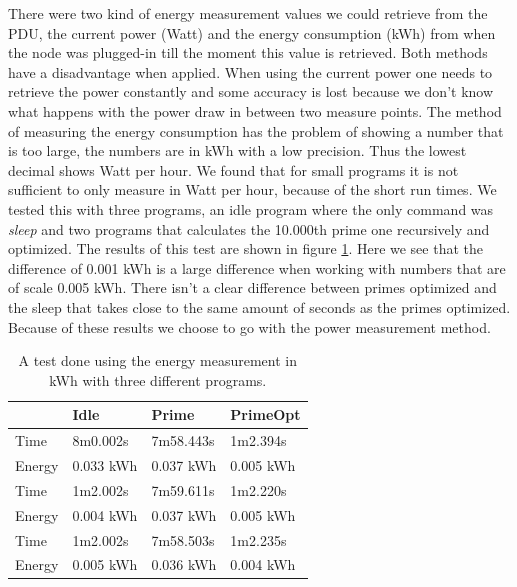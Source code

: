There were two kind of energy measurement values we could retrieve from the PDU, the current power (Watt) and the energy consumption (kWh) from when the node was plugged-in till the moment this value is retrieved. Both methods have a disadvantage when applied. When using the current power one needs to retrieve the power constantly and some accuracy is lost because we don't know what happens with the power draw in between two measure points. The method of measuring the energy consumption has the problem of showing a number that is too large, the numbers are in kWh with a low precision. Thus the lowest decimal shows Watt per hour. We found that for small programs it is not sufficient to only measure in Watt per hour, because of the short run times. We tested this with three programs, an idle program where the only command was \textit{sleep} and two programs that calculates the 10.000th prime one recursively and optimized. The results of this test are shown in figure \ref{tab:EMmethod}. Here we see that the difference of 0.001 kWh is a large difference when working with numbers that are of scale 0.005 kWh. There isn't a clear difference between primes optimized and the sleep that takes close to the same amount of seconds as the primes optimized. Because of these results we choose to go with the power measurement method.\\

\begin{table}[h]
\centering
\begin{tabular}{|l|l|l|l|}
\hline
       & \textbf{Idle}      & \textbf{Prime}     & \textbf{PrimeOpt}  \\ \hline
Time   & 8m0.002s  & 7m58.443s & 1m2.394s  \\
Energy & 0.033 kWh & 0.037 kWh & 0.005 kWh \\ \hline
Time   & 1m2.002s  & 7m59.611s & 1m2.220s  \\
Energy & 0.004 kWh & 0.037 kWh & 0.005 kWh \\ \hline
Time   & 1m2.002s  & 7m58.503s & 1m2.235s  \\
Energy & 0.005 kWh & 0.036 kWh & 0.004 kWh \\ \hline
\end{tabular}
\caption{A test done using the energy measurement in kWh with three different programs.}
\label{tab:EMmethod}
\end{table}

